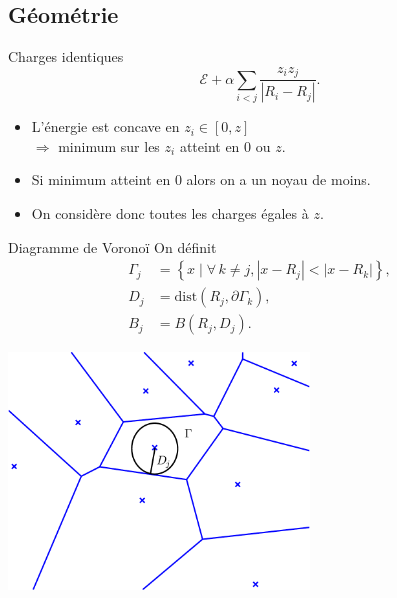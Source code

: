 \documentclass{beamer}
\begin{document}
\subsection{Géométrie}
\begin{frame}{Charges identiques}
            \[\mathcal{E} + \alpha\sum_{i < j} \frac{z_i z_j}{|R_i-R_j|}.\]
    \begin{itemize}
        \item L'énergie est concave en $z_i \in [0, z]$\\
            $\Rightarrow$ minimum sur les $z_i$ atteint en $0$ ou $z$.
        \item Si minimum atteint en $0$ alors on a un noyau de moins.
        \item On considère donc toutes les charges égales à $z$.
    \end{itemize}
\end{frame}
\begin{frame}{Diagramme de Voronoï}
    On définit
    \begin{align*}
      \Gamma_j &= \left\{x \; \big| \; \forall\, k\neq j, |x-R_j| < |x-R_k|\right\},\\
      D_j &= \mathrm{dist}(R_j, \mathit{\partial}\Gamma_k),\\
      B_j &= {B(R_j, D_j)}.
    \end{align*}
    \begin{center}
    \includegraphics[width=0.6\textwidth]{voronoi.pdf}
    \end{center}
\end{frame}
\end{document}
